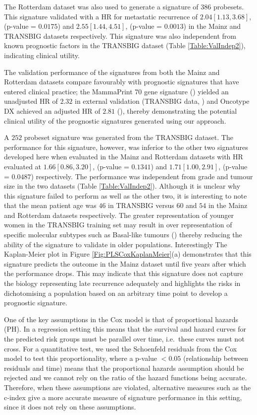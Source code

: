 \documentclass[letterpaper,12pt]{article}
\begin{document}
The Rotterdam dataset was also used to generate a signature of $386$ probesets. This signature validated with a HR for metastatic recurrence of $2.04 [1.13, 3.68]$, (p-value = $0.0175$) and $2.55 [1.44, 4.51]$, (p-value = $0.0013$) in the Mainz and TRANSBIG datasets respectively. This signature was also independent from known prognostic factors in the TRANSBIG dataset (Table \ref{Table:ValIndep2}), indicating clinical utility.

The validation performance of the signatures from both the Mainz and Rotterdam datasets compare favourably with prognostic signatures that have entered clinical practice; the MammaPrint 70 gene signature (\citet{Veer:02}) yielded an unadjusted HR of $2.32$ in external validation (TRANSBIG data, \citet{Buyse:06}) and Oncotype DX achieved an adjusted HR of $2.81$ (\citet{Paik:04}), thereby demonstrating the potential clinical utility of the prognostic signatures generated using our approach.

A $252$ probeset signature was generated from the TRANSBIG dataset. The performance for this signature, however, was inferior to the other two signatures developed here when evaluated in the Mainz and Rotterdam datasets with HR evaluated at $1.66 [0.86, 3.20]$, (p-value = $0.1341$) and $1.71 [1.00, 2.91]$, (p-value = $0.0487$) respectively. The performance was independent from grade and tumour size in the two datasets (Table \ref{Table:ValIndep2}). Although it is unclear why this signature failed to perform as well as the other two, it is interesting to note that the mean patient age was $46$ in TRANSBIG versus $60$ and $54$ in the Mainz and Rotterdam datasets respectively. The greater representation of younger women in the TRANSBIG training set may result in over representation of specific molecular subtypes such as Basal-like tumours (\citet{Millikan:08}) thereby reducing the ability of the signature to validate in older populations. Interestingly The Kaplan-Meier plot in Figure %
\ref{Fig:PLSCoxKaplanMeier}(a) demonstrates that this signature predicts the outcome in the Mainz dataset until five years after which the performance drops. This may indicate that this signature does not capture the biology representing late recurrence adequately and highlights the risks in dichotomising a population based on an arbitrary time point to develop a prognostic signature. 

One of the key assumptions in the Cox model is that of proportional hazards (PH). In a regression setting this means that the survival and hazard curves for the predicted risk groups must be parallel over time, i.e.\ these curves must not cross. For a quantitative test, we used the Schoenfeld residuals from the Cox model to test this proportionality, where a p-value $< 0.05$ (relationship between residuals and time) means that the proportional hazards assumption should be rejected and we cannot rely on the ratio of the hazard functions being accurate. Therefore, when these assumptions are violated, alternative measures such as the c-index give a more accurate measure of signature performance in this setting, since it does not rely on these assumptions.
\end{document}

